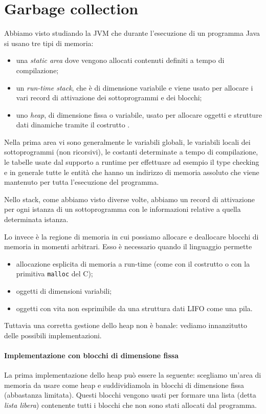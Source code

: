 \section{Garbage collection}

Abbiamo visto studiando la JVM che durante l'esecuzione di un programma Java si usano tre tipi di memoria:
\begin{itemize}
    \item una \emph{static area} dove vengono allocati contenuti definiti a tempo di compilazione;
    \item un \emph{run-time stack}, che è di dimensione variabile e viene usato per allocare i vari record di attivazione dei sottoprogrammi e dei blocchi;
    \item uno \emph{heap}, di dimensione fissa o variabile, usato per allocare oggetti e strutture dati dinamiche tramite il costrutto .
\end{itemize}

Nella prima area vi sono generalmente le variabili globali, le variabili locali dei sottoprogrammi (non ricorsivi), le costanti determinate a tempo di compilazione, le tabelle usate dal supporto a runtime per effettuare ad esempio il type checking e in generale tutte le entità che hanno un indirizzo di memoria assoluto che viene mantenuto per tutta l'esecuzione del programma.

Nello stack, come abbiamo visto diverse volte, abbiamo un record di attivazione per ogni istanza di un sottoprogramma con le informazioni relative a quella determinata istanza.

Lo  invece è la regione di memoria in cui possiamo allocare e deallocare blocchi di memoria in momenti arbitrari. Esso è necessario quando il linguaggio permette \begin{itemize}
    \item allocazione esplicita di memoria a run-time (come con il costrutto  o con la primitiva \texttt{malloc} del C);
    \item oggetti di dimensioni variabili;
    \item oggetti con vita non esprimibile da una struttura dati LIFO come una pila.
\end{itemize}
Tuttavia una corretta gestione dello heap non è banale: vediamo innanzitutto delle possibili implementazioni.

\paragraph{Implementazione con blocchi di dimensione fissa}
La prima implementazione dello heap può essere la seguente: scegliamo un'area di memoria da usare come heap e suddividiamola in blocchi di dimensione fissa (abbastanza limitata). Questi blocchi vengono usati per formare una lista (detta \emph{lista libera}) contenente tutti i blocchi che non sono stati allocati dal programma. 

